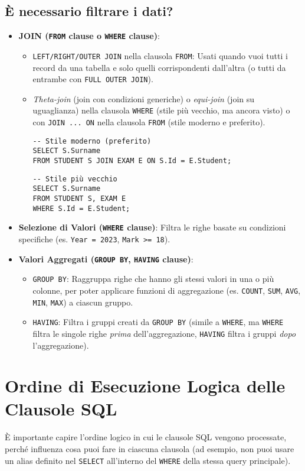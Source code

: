 \subsection{È necessario filtrare i dati?}
\begin{itemize}
    \item \textbf{JOIN (\texttt{FROM} clause o \texttt{WHERE} clause)}:
    \begin{itemize}
        \item \texttt{LEFT/RIGHT/OUTER JOIN} nella clausola \texttt{FROM}: Usati quando vuoi tutti i record da una tabella e solo quelli corrispondenti dall'altra (o tutti da entrambe con \texttt{FULL OUTER JOIN}).
        \item \textit{Theta-join} (join con condizioni generiche) o \textit{equi-join} (join su uguaglianza) nella clausola \texttt{WHERE} (stile più vecchio, ma ancora visto) o con \texttt{JOIN ... ON} nella clausola \texttt{FROM} (stile moderno e preferito).
        \begin{verbatim}
-- Stile moderno (preferito)
SELECT S.Surname
FROM STUDENT S JOIN EXAM E ON S.Id = E.Student;
        \end{verbatim}
        \begin{verbatim}
-- Stile più vecchio
SELECT S.Surname
FROM STUDENT S, EXAM E
WHERE S.Id = E.Student;
        \end{verbatim}
    \end{itemize}
    \item \textbf{Selezione di Valori (\texttt{WHERE} clause)}: Filtra le righe basate su condizioni specifiche (es. \texttt{Year = 2023}, \texttt{Mark >= 18}).
    \item \textbf{Valori Aggregati (\texttt{GROUP BY}, \texttt{HAVING} clause)}:
    \begin{itemize}
        \item \texttt{GROUP BY}: Raggruppa righe che hanno gli stessi valori in una o più colonne, per poter applicare funzioni di aggregazione (es. \texttt{COUNT}, \texttt{SUM}, \texttt{AVG}, \texttt{MIN}, \texttt{MAX}) a ciascun gruppo.
        \item \texttt{HAVING}: Filtra i gruppi creati da \texttt{GROUP BY} (simile a \texttt{WHERE}, ma \texttt{WHERE} filtra le singole righe \textit{prima} dell'aggregazione, \texttt{HAVING} filtra i gruppi \textit{dopo} l'aggregazione).
    \end{itemize}
\end{itemize}\section{Ordine di Esecuzione Logica delle Clausole SQL}
È importante capire l'ordine logico in cui le clausole SQL vengono processate, perché influenza cosa puoi fare in ciascuna clausola (ad esempio, non puoi usare un alias definito nel \texttt{SELECT} all'interno del \texttt{WHERE} della stessa query principale).

